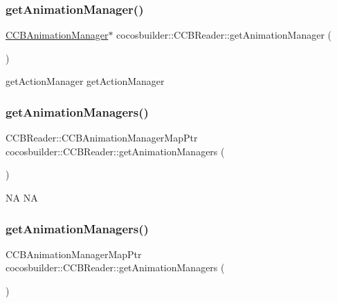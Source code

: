 \subsubsection{\texorpdfstring{get\+Animation\+Manager()}{getAnimationManager()}\hspace{0.1cm}{\footnotesize\ttfamily [2/2]}}
{\footnotesize\ttfamily \hyperlink{classcocosbuilder_1_1CCBAnimationManager}{C\+C\+B\+Animation\+Manager}$\ast$ cocosbuilder\+::\+C\+C\+B\+Reader\+::get\+Animation\+Manager (\begin{DoxyParamCaption}{ }\end{DoxyParamCaption})}

get\+Action\+Manager  get\+Action\+Manager \mbox{\label{classcocosbuilder_1_1CCBReader_a0da8829af60a145f25d9496b4fd44534}} 
\subsubsection{\texorpdfstring{get\+Animation\+Managers()}{getAnimationManagers()}\hspace{0.1cm}{\footnotesize\ttfamily [1/2]}}
{\footnotesize\ttfamily C\+C\+B\+Reader\+::\+C\+C\+B\+Animation\+Manager\+Map\+Ptr cocosbuilder\+::\+C\+C\+B\+Reader\+::get\+Animation\+Managers (\begin{DoxyParamCaption}{ }\end{DoxyParamCaption})}

NA  NA \mbox{\label{classcocosbuilder_1_1CCBReader_a7e2bf8907f509dc3690e544911b217dd}} 
\subsubsection{\texorpdfstring{get\+Animation\+Managers()}{getAnimationManagers()}\hspace{0.1cm}{\footnotesize\ttfamily [2/2]}}
{\footnotesize\ttfamily C\+C\+B\+Animation\+Manager\+Map\+Ptr cocosbuilder\+::\+C\+C\+B\+Reader\+::get\+Animation\+Managers (\begin{DoxyParamCaption}{ }\end{DoxyParamCaption})}

